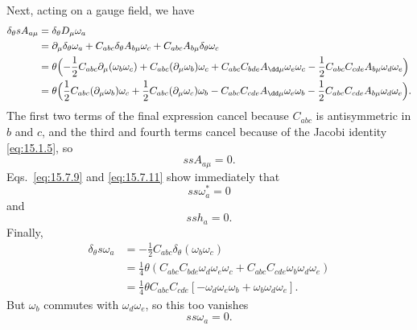 Next, acting on a gauge field, we have
\begin{align*}
 \delta_\theta sA_{a\mu}
 &=\delta_\theta D_\mu\omega_a\\
 &=\partial_\mu\delta_\theta\omega_a
 +C_{abc}\delta_\theta A_{b\mu}\omega_c
 +C_{abc}A_{b\mu}\delta_\theta\omega_c\\
 &=\theta\Bigl(-\frac{1}{2}C_{abc}\partial_\mu(\omega_b\omega_c)
 +C_{abc}(\partial_\mu\omega_b)\omega_c
 +C_{abc}C_{bde}A_{\dd\mu}\omega_e\omega_c
 -\frac{1}{2}C_{abc}C_{cde}A_{b\mu}\omega_d\omega_e\Bigr)\\
 &=\theta\Bigl(\frac{1}{2}C_{abc}(\partial_\mu\omega_b)\omega_c
 +\frac{1}{2}C_{abc}(\partial_\mu\omega_c)\omega_b
 -C_{abc}C_{cde}A_{\dd\mu}\omega_e\omega_b
 -\frac{1}{2}C_{abc}C_{cde}A_{b\mu}\omega_d\omega_e\Bigr).
\end{align*}
The first two terms of the final expression cancel because $C_{abc}$ is antisymmetric in $b$ and $c$, and the third and fourth terms cancel because of the Jacobi identity \eqref{eq:15.1.5}, so
\begin{equation}
 ssA_{a\mu}=0.
 \tag{15.7.16}\label{eq:15.7.16}
\end{equation}
Eqs.~\eqref{eq:15.7.9} and \eqref{eq:15.7.11} show immediately that
\begin{equation}
 ss\omega_a^*=0
 \tag{15.7.17}\label{eq:15.7.17}
\end{equation}
and
\begin{equation}
 ssh_a=0.
 \tag{15.7.18}\label{eq:15.7.18}
\end{equation}
Finally,
\begin{align*}
 \delta_\theta s\omega_a
 &=-\frac{1}{2}C_{abc}\delta_\theta(\omega_b\omega_c)\\
 &=\frac{1}{4}\theta\left(C_{abc}C_{bde}\omega_d\omega_e\omega_c
 +C_{abc}C_{cde}\omega_b\omega_d\omega_e\right)\\
 &=\frac{1}{4}\theta C_{abc}C_{cde}
 \left[-\omega_d\omega_e\omega_b+\omega_b\omega_d\omega_e\right].
\end{align*}
But $\omega_b$ commutes with $\omega_d\omega_e$, so this too vanishes
\begin{equation}
 ss\omega_a=0.
 \tag{15.7.19}\label{eq:15.7.19}
\end{equation}

